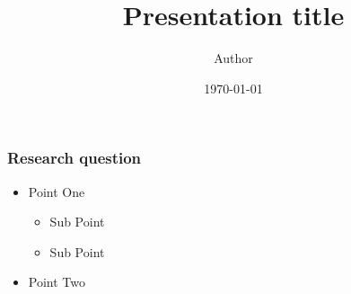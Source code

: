 \documentclass{beamer}
\title{Presentation title}
\author{Author}
\institute{Affiliation}
\date{\today}
\begin{document}
\frame{\titlepage}

\begin{frame}
\frametitle{Research question}
\begin{itemize}
	\item Point One 
	\begin{itemize}
		\item Sub Point
		\item Sub Point  
	\end{itemize}
 	\item Point Two
\end{itemize}
\end{frame}
\end{document}
